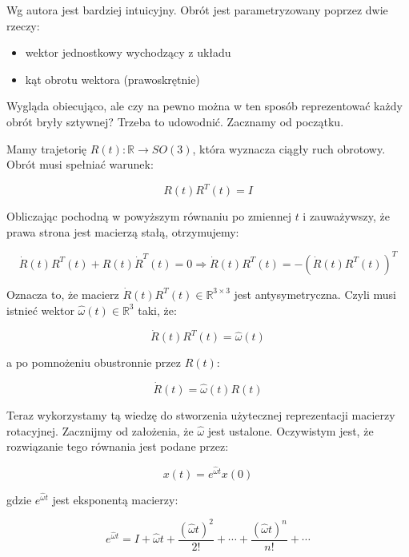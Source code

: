 \documentclass[a4paper,12pt]{article}
\newcommand{\R}{\mathbb{R}}
\newcommand{\RR}{\mathbb{R}^3}
\newcommand{\RRR}{\mathbb{R}^{3 \times 3}}
\begin{document}
Wg autora jest bardziej intuicyjny. Obrót jest parametryzowany poprzez dwie rzeczy:

\begin{itemize}
\item wektor jednostkowy wychodzący z układu
\item kąt obrotu wektora (prawoskrętnie)
\end{itemize}

Wygląda obiecująco, ale czy na pewno można w ten sposób reprezentować każdy obrót bryły sztywnej? Trzeba to udowodnić. Zacznamy od początku.

Mamy trajetorię $R(t): \R \rightarrow SO(3)$, która wyznacza ciągły ruch obrotowy. Obrót musi spełniać warunek:

\begin{equation}
R(t)R^T(t)=I
\end{equation}

Obliczając pochodną w powyższym równaniu po zmiennej $t$ i zauważywszy, że prawa strona jest macierzą stałą, otrzymujemy:

\begin{equation}
\dot{R}(t)R^T(t) + R(t)\dot{R}^T(t)=0 \Rightarrow \dot{R}(t)R^T(t)=-(\dot{R}(t)R^T(t))^T
\end{equation}

Oznacza to, że macierz $\dot{R}(t)R^T(t) \in \RRR$ jest antysymetryczna. Czyli musi istnieć wektor $\hat{\omega}(t) \in \RR$ taki, że:

\begin{equation}
\dot{R}(t)R^T(t) = \hat{\omega}(t)
\end{equation}

\noindent a po pomnożeniu obustronnie przez $R(t)$:

\begin{equation}
\dot{R}(t) = \hat{\omega}(t)R(t)
\end{equation}

Teraz wykorzystamy tą wiedzę do stworzenia użytecznej reprezentacji macierzy rotacyjnej. Zacznijmy od założenia, że $\hat{\omega}$ jest ustalone. Oczywistym jest, że rozwiązanie tego równania jest podane przez:

\begin{equation}
x(t) = e^{\hat{\omega}t}x(0)
\end{equation}

\noindent gdzie $e^{\hat{\omega}t}$ jest eksponentą macierzy:

\begin{equation}
e^{\hat{\omega}t} = I + \hat{\omega}t + \frac{(\hat{\omega}t)^2}{2!} + \cdots + \frac{(\hat{\omega}t)^n}{n!} + \cdots
\end{equation}
\end{document}
